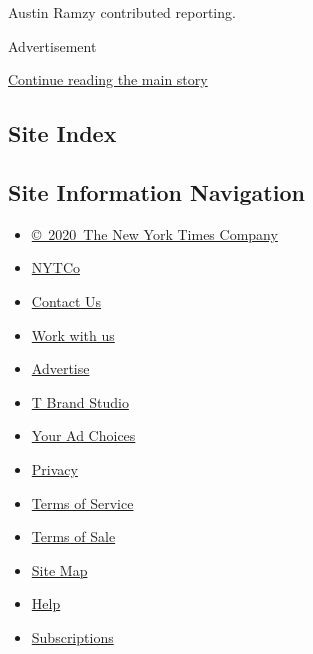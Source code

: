 Austin Ramzy contributed reporting.

Advertisement

\protect\hyperlink{after-bottom}{Continue reading the main story}

\hypertarget{site-index}{%
\subsection{Site Index}\label{site-index}}

\hypertarget{site-information-navigation}{%
\subsection{Site Information
Navigation}\label{site-information-navigation}}

\begin{itemize}
\tightlist
\item
  \href{https://help.nytimes.com/hc/en-us/articles/115014792127-Copyright-notice}{©~2020~The
  New York Times Company}
\end{itemize}

\begin{itemize}
\tightlist
\item
  \href{https://www.nytco.com/}{NYTCo}
\item
  \href{https://help.nytimes.com/hc/en-us/articles/115015385887-Contact-Us}{Contact
  Us}
\item
  \href{https://www.nytco.com/careers/}{Work with us}
\item
  \href{https://nytmediakit.com/}{Advertise}
\item
  \href{http://www.tbrandstudio.com/}{T Brand Studio}
\item
  \href{https://www.nytimes.com/privacy/cookie-policy\#how-do-i-manage-trackers}{Your
  Ad Choices}
\item
  \href{https://www.nytimes.com/privacy}{Privacy}
\item
  \href{https://help.nytimes.com/hc/en-us/articles/115014893428-Terms-of-service}{Terms
  of Service}
\item
  \href{https://help.nytimes.com/hc/en-us/articles/115014893968-Terms-of-sale}{Terms
  of Sale}
\item
  \href{https://spiderbites.nytimes.com}{Site Map}
\item
  \href{https://help.nytimes.com/hc/en-us}{Help}
\item
  \href{https://www.nytimes.com/subscription?campaignId=37WXW}{Subscriptions}
\end{itemize}
